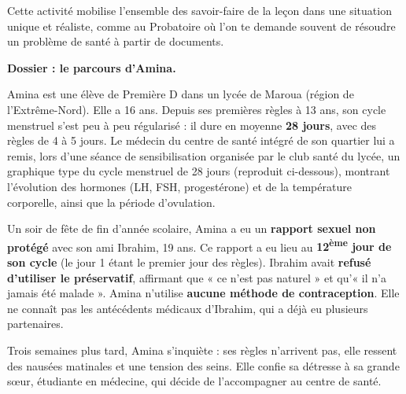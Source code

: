 \documentclass[11pt]{article}
\newcounter{popsec}
\newcounter{popsub}
\newcommand{\courssub}[1]{%
  \stepcounter{popsub}%
  \par\vspace{9pt}\noindent{\popxbold\fontsize{11.5}{13}\selectfont\color{popink}{\color{poporange}\thepopsec.\thepopsub}\hspace{6pt}#1}\par\nopagebreak\vspace{4pt}
}
\begin{document}
Cette activité mobilise l'ensemble des savoir-faire de la leçon dans une situation unique et réaliste, comme au Probatoire où l'on te demande souvent de résoudre un problème de santé à partir de documents.

\courssub{Situation}

\textbf{Dossier : le parcours d'Amina.}

Amina est une élève de Première D dans un lycée de Maroua (région de l'Extrême-Nord). Elle a 16 ans. Depuis ses premières règles à 13 ans, son cycle menstruel s'est peu à peu régularisé : il dure en moyenne \textbf{28 jours}, avec des règles de 4 à 5 jours. Le médecin du centre de santé intégré de son quartier lui a remis, lors d'une séance de sensibilisation organisée par le club santé du lycée, un graphique type du cycle menstruel de 28 jours (reproduit ci-dessous), montrant l'évolution des hormones (LH, FSH, progestérone) et de la température corporelle, ainsi que la période d'ovulation.

Un soir de fête de fin d'année scolaire, Amina a eu un \textbf{rapport sexuel non protégé} avec son ami Ibrahim, 19 ans. Ce rapport a eu lieu au \textbf{12\textsuperscript{ème} jour de son cycle} (le jour 1 étant le premier jour des règles). Ibrahim avait \textbf{refusé d'utiliser le préservatif}, affirmant que « ce n'est pas naturel » et qu'« il n'a jamais été malade ». Amina n'utilise \textbf{aucune méthode de contraception}. Elle ne connaît pas les antécédents médicaux d'Ibrahim, qui a déjà eu plusieurs partenaires.

Trois semaines plus tard, Amina s'inquiète : ses règles n'arrivent pas, elle ressent des nausées matinales et une tension des seins. Elle confie sa détresse à sa grande sœur, étudiante en médecine, qui décide de l'accompagner au centre de santé.
\end{document}

